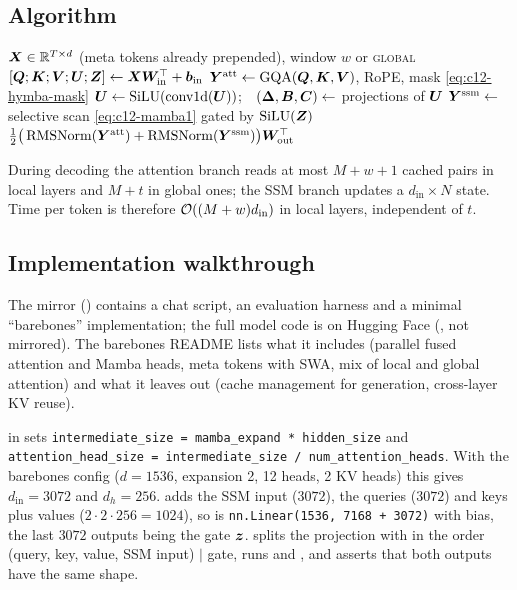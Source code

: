 \subsection{Algorithm}

\begin{algorithm}[t]
\caption{Forward pass of a Hymba-style hybrid-head layer (prefill; one sequence).}
\label{alg:c12-hymba}
\begin{algorithmic}[1]
\Require $\bm{X}\in\mathbb{R}^{T\times d}$ (meta tokens already prepended), window $w$ or \textsc{global}
\State $[\bm{Q};\bm{K};\bm{V};\bm{U};\bm{Z}] \gets \bm{X}\bm{W}_{\mathrm{in}}^{\top} + \bm{b}_{\mathrm{in}}$ 
\State $\bm{Y}^{\mathrm{att}} \gets \mathrm{GQA}(\bm{Q},\bm{K},\bm{V})$, RoPE, mask \eqref{eq:c12-hymba-mask} 
\State $\bm{U} \gets \operatorname{SiLU}(\mathrm{conv1d}(\bm{U}))$;\ \ $(\bm\Delta,\bm{B},\bm{C}) \gets$ projections of $\bm{U}$
\State $\bm{Y}^{\mathrm{ssm}} \gets$ selective scan \eqref{eq:c12-mamba1} gated by $\operatorname{SiLU}(\bm{Z})$ 
\State \Return $\tfrac12\big(\operatorname{RMSNorm}(\bm{Y}^{\mathrm{att}}) + \operatorname{RMSNorm}(\bm{Y}^{\mathrm{ssm}})\big)\bm{W}_{\mathrm{out}}^{\top}$
\end{algorithmic}
\end{algorithm}

During decoding the attention branch reads at most $M + w + 1$ cached pairs in local layers and
$M+t$ in global ones; the SSM branch updates a $d_{\mathrm{in}}\times N$ state. Time per token is
therefore $\mathcal{O}((M+w)d_{\mathrm{in}})$ in local layers, independent of $t$.

\subsection{Implementation walkthrough}

The mirror () contains a chat script, an evaluation harness and a minimal
``barebones'' implementation; the full model code is on Hugging Face (,
not mirrored). The barebones README lists what it includes (parallel fused attention and Mamba
heads, meta tokens with SWA, mix of local and global attention) and what it leaves out (cache
management for generation, cross-layer KV reuse).

\begin{implnote}[title={In the code: one projection, split five ways}]
 in 
sets \texttt{intermediate\_size = mamba\_expand * hidden\_size} and
\texttt{attention\_head\_size = intermediate\_size / num\_attention\_heads}. With the barebones config
($d = 1536$, expansion 2, 12 heads, 2 KV heads) this gives $d_{\mathrm{in}} = 3072$ and $d_h=256$.
 adds the SSM input ($3072$), the queries ($3072$) and keys plus values
($2\cdot2\cdot256 = 1024$), so  is \texttt{nn.Linear(1536, 7168 + 3072)} with bias,
the last $3072$ outputs being the gate $\bm{z}$.  splits the projection with
 in the order (query, key, value, SSM input) $|$ gate, runs
 and , and asserts that both outputs have the same shape.
\end{implnote}

